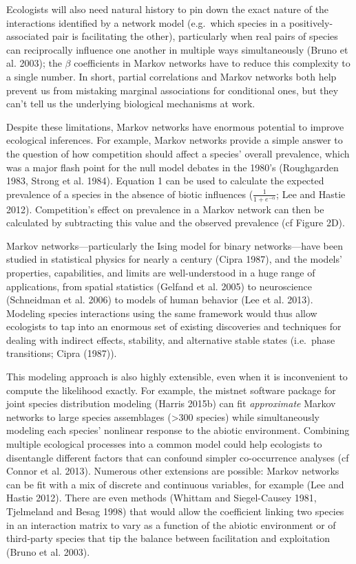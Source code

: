 \documentclass[12pt,]{article}
\begin{document}
\begin{spacing}{1.9}
\begin{flushleft}
Ecologists will also need natural history to pin down the exact nature
of the interactions identified by a network model (e.g.~which species in
a positively-associated pair is facilitating the other), particularly
when real pairs of species can reciprocally influence one another in
multiple ways simultaneously (Bruno et al. 2003); the \(\beta\)
coefficients in Markov networks have to reduce this complexity to a
single number. In short, partial correlations and Markov networks both
help prevent us from mistaking marginal associations for conditional
ones, but they can't tell us the underlying biological mechanisms at
work.

Despite these limitations, Markov networks have enormous potential to
improve ecological inferences. For example, Markov networks provide a
simple answer to the question of how competition should affect a
species' overall prevalence, which was a major flash point for the null
model debates in the 1980's (Roughgarden 1983, Strong et al. 1984).
Equation 1 can be used to calculate the expected prevalence of a species
in the absence of biotic influences (\(\frac{1}{1 + e^{-\alpha}}\); Lee
and Hastie 2012). Competition's effect on prevalence in a Markov network
can then be calculated by subtracting this value and the observed
prevalence (cf Figure 2D).

Markov networks---particularly the Ising model for binary
networks---have been studied in statistical physics for nearly a century
(Cipra 1987), and the models' properties, capabilities, and limits are
well-understood in a huge range of applications, from spatial statistics
(Gelfand et al. 2005) to neuroscience (Schneidman et al. 2006) to models
of human behavior (Lee et al. 2013). Modeling species interactions using
the same framework would thus allow ecologists to tap into an enormous
set of existing discoveries and techniques for dealing with indirect
effects, stability, and alternative stable states (i.e.~phase
transitions; Cipra (1987)).

This modeling approach is also highly extensible, even when it is
inconvenient to compute the likelihood exactly. For example, the mistnet
software package for joint species distribution modeling (Harris 2015b)
can fit \emph{approximate} Markov networks to large species assemblages
(\textgreater{}300 species) while simultaneously modeling each species'
nonlinear response to the abiotic environment. Combining multiple
ecological processes into a common model could help ecologists to
disentangle different factors that can confound simpler co-occurrence
analyses (cf Connor et al. 2013). Numerous other extensions are
possible: Markov networks can be fit with a mix of discrete and
continuous variables, for example (Lee and Hastie 2012). There are even
methods (Whittam and Siegel-Causey 1981, Tjelmeland and Besag 1998) that
would allow the coefficient linking two species in an interaction matrix
to vary as a function of the abiotic environment or of third-party
species that tip the balance between facilitation and exploitation
(Bruno et al. 2003).


\end{flushleft}
\end{spacing}
\end{document}
